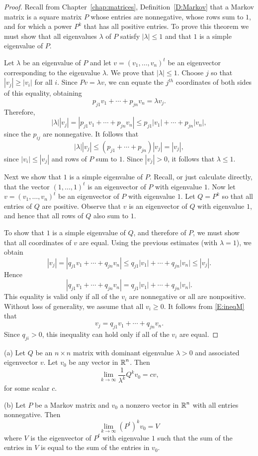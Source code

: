 \documentclass{ximera}
\begin{document}
\begin{proof}  Recall from Chapter~\ref{chap:matrices}, Definition~\ref{D:Markov} 
that a Markov matrix is a square matrix $P$ whose entries are nonnegative, 
whose rows sum to $1$, and for which a power $P^k$ that has all positive 
entries.  To prove this theorem we must show that all eigenvalues $\lambda$ 
of $P$ satisfy $|\lambda|\leq 1$ and that $1$ is a simple eigenvalue of $P$.

Let $\lambda$ be an eigenvalue of $P$ and let $v=(v_1,\ldots,v_n)^t$ be an 
eigenvector corresponding to the eigenvalue $\lambda$.  We prove that 
$|\lambda|\leq 1$.  Choose $j$ so that $|v_j|\ge|v_i|$ for all $i$.  Since 
$Pv=\lambda v$, we can equate the $j^{th}$ coordinates of both sides of 
this equality, obtaining
\[
p_{j1}v_1 + \cdots + p_{jn}v_n = \lambda v_j.
\]
Therefore,
\[
 |\lambda| |v_j| = |p_{j1}v_1 + \cdots + p_{jn}v_n| \leq 
p_{j1}|v_1| + \cdots + p_{jn}|v_n|,
\]
since the $p_{ij}$ are nonnegative.  It follows that 
\[
|\lambda| |v_j| \leq (p_{j1}+\cdots+p_{jn})|v_j| =|v_j|,
\]
since $|v_i|\le|v_j|$ and rows of $P$ sum to $1$.  Since $|v_j|>0$, it 
follows that $\lambda\leq 1$.

Next we show that $1$ is a simple eigenvalue of $P$.  Recall, or just 
calculate directly, that the vector $(1,\ldots,1)^t$ is an eigenvector of $P$ 
with eigenvalue $1$.  Now let $v=(v_1,\ldots,v_n)^t$ be an eigenvector of $P$ 
with eigenvalue $1$.  Let $Q=P^k$ so that all entries of $Q$ are positive. 
Observe that $v$ is an eigenvector of $Q$ with eigenvalue $1$, and hence that 
all rows of $Q$ also sum to $1$.

To show that $1$ is a simple eigenvalue of $Q$, and therefore of $P$, we must 
show that all coordinates of $v$ are equal.  Using the previous estimates 
(with $\lambda=1$), we obtain 
\begin{equation}  \label{E:ineqM}
|v_j|= |q_{j1}v_1 + \cdots + q_{jn}v_n| \leq  q_{j1}|v_1| + \cdots + 
q_{jn}|v_n| \leq |v_j|.
\end{equation}
Hence 
\[
|q_{j1}v_1 + \cdots + q_{jn}v_n| =  q_{j1}|v_1| + \cdots + q_{jn}|v_n|.
\]
This equality is valid only if all of the $v_i$ are nonnegative or all are 
nonpositive.  Without loss of generality, we assume that all $v_i\geq 0$.
It follows from \eqref{E:ineqM} that 
\[
v_j= q_{j1}v_1 + \cdots + q_{jn}v_n.
\]
Since $q_{ji}>0$, this inequality can hold only if all of the $v_i$ are
equal.  \end{proof}


\begin{theorem} \label{T:convergetoeig}
(a)  Let $Q$ be an $n\times n$ matrix with dominant eigenvalue 
$\lambda>0$ and associated eigenvector $v$.  Let $v_0$ be any vector in 
$\mbox{$\Bbb{R}$}^n$.  Then
\[
\lim_{k\to\infty}\frac{1}{\lambda^k}Q^kv_0 = cv,
\]
for some scalar $c$.

(b)  Let $P$ be a Markov matrix and $v_0$ a nonzero vector in $\mbox{$\Bbb{R}$}^n$
with all entries nonnegative.  Then 
\[
\lim_{k\to\infty}(P^t)^kv_0 = V
\]
where $V$ is the eigenvector of $P^t$ with eigenvalue $1$ such that the 
sum of the entries in $V$ is equal to the sum of the entries in $v_0$.
\end{theorem} 
\end{document}
